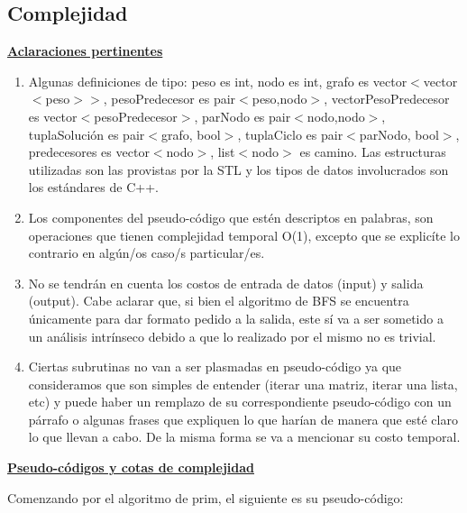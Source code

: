 \newpage
\subsection{Complejidad}

\noindent \textbf{\underline{Aclaraciones pertinentes}}

\begin{enumerate}
\item Algunas definiciones de tipo: peso es int, nodo es int, grafo es vector$<$vector$<$peso$>>$, pesoPredecesor es pair$<$peso,nodo$>$, vectorPesoPredecesor es vector$<$pesoPredecesor$>$, parNodo es pair$<$nodo,nodo$>$, tuplaSolución es pair$<$grafo, bool$>$, tuplaCiclo es pair$<$parNodo, bool$>$, predecesores es vector$<$nodo$>$, list$<$nodo$>$ es camino. Las estructuras utilizadas son las provistas por la STL y los tipos de datos involucrados son los estándares de C++.
\item Los componentes del pseudo-código que estén descriptos en palabras, son operaciones que tienen complejidad temporal O(1), excepto que se explicíte lo contrario en algún/os caso/s particular/es.
\item No se tendrán en cuenta los costos de entrada de datos (input) y salida (output). Cabe aclarar que, si bien el algoritmo de BFS se encuentra únicamente para dar formato pedido a la salida, este sí va a ser sometido a un análisis intrínseco debido a que lo realizado por el mismo no es trivial.
\item Ciertas subrutinas no van a ser plasmadas en pseudo-código ya que consideramos que son simples de entender (iterar una matriz, iterar una lista, etc) y puede haber un remplazo de su correspondiente pseudo-código con un párrafo o algunas frases que expliquen lo que harían de manera que esté claro lo que llevan a cabo. De la misma forma se va a mencionar su costo temporal.
\end{enumerate}

\noindent \textbf{\underline{Pseudo-códigos y cotas de complejidad}}

Comenzando por el algoritmo de prim, el siguiente es su pseudo-código:

